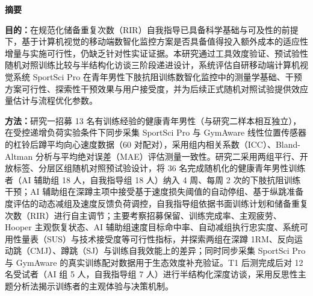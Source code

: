 
\pagestyle{empty}
\begin{center}
\textbf{摘\quad 要}
\end{center}

\textbf{目的：}在规范化储备重复次数（RIR）自我指导已具备科学基础与可及性的前提下，基于计算机视觉的移动端数智化监控方案是否具备值得投入额外成本的适应性增量与实施可行性，仍缺乏针对性实证证据。本研究通过工具效度验证、预试验性随机对照训练比较与半结构化访谈三阶段递进设计，系统评估自研移动端计算机视觉系统 SportSci Pro 在青年男性下肢抗阻训练数智化监控中的测量学基础、干预方案可行性、探索性干预效果与用户接受度，并为后续正式随机对照试验提供效应量估计与流程优化参数。

\textbf{方法：}研究一招募 13 名有训练经验的健康青年男性（与研究二样本相互独立），在受控递增负荷实验条件下同步采集 SportSci Pro 与 GymAware 线性位置传感器的杠铃后蹲平均向心速度数据（60 对配对），采用组内相关系数（ICC）、Bland-Altman 分析与平均绝对误差（MAE）评估测量一致性。研究二采用两组平行、开放标签、分层区组随机对照预试验设计，将 36 名完成随机化的健康青年男性训练者（AI 辅助组 18 人，自我指导组 18 人）纳入 4 周、每周 2 次的下肢抗阻训练干预；AI 辅助组在深蹲主项中接受基于速度损失阈值的自动停组、基于纵跳准备度评估的动态减组及速度反馈负荷调控，自我指导组依据书面训练计划和储备重复次数（RIR）进行自主调节；主要考察招募保留、训练完成率、主观疲劳、Hooper 主观恢复状态、AI 辅助组速度目标命中率、自动减组执行忠实度、系统可用性量表（SUS）与技术接受度等可行性指标，并探索两组在深蹲 1RM、反向运动跳（CMJ）、蹲跳（SJ）与训练自我效能上的差异；同时同步采集 SportSci Pro 与 GymAware 的真实训练配对数据用于生态效度补充验证。T1 后测完成后对 12 名受试者（AI 组 5 人，自我指导组 7 人）进行半结构化深度访谈，采用反思性主题分析法揭示训练者的主观体验与决策机制。

